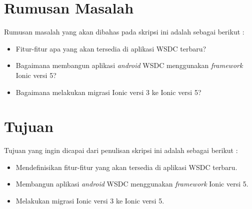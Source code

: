 \documentclass[a4paper,twoside]{article}
\begin{document}
\section{Rumusan Masalah}
Rumusan masalah yang akan dibahas pada skripsi ini adalah sebagai berikut :
\begin{itemize}
	\item Fitur-fitur apa yang akan tersedia di aplikasi WSDC terbaru?
	\item Bagaimana membangun aplikasi {\it android} WSDC menggunakan {\it framework} Ionic versi 5?
	\item Bagaimana melakukan migrasi Ionic versi 3 ke Ionic versi 5?
\end{itemize}

\section{Tujuan}
Tujuan yang ingin dicapai dari penulisan skripsi ini adalah sebagai berikut :
\begin{itemize}
	\item Mendefinisikan fitur-fitur yang akan tersedia di aplikasi WSDC terbaru.
	\item Membangun aplikasi {\it android} WSDC menggunakan {\it framework} Ionic versi 5.
	\item Melakukan migrasi Ionic versi 3 ke Ionic versi 5.
\end{itemize}
\end{document}
